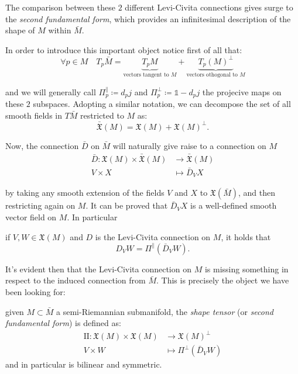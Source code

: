 The comparison between these \(2\) different Levi-Civita connections gives surge to the \emph{second fundamental form}, which provides an infinitesimal description of the shape of \(M\) within \(\bar{M}\).

In order to introduce this important object notice first of all that:
\[
\forall p \in M \quad T_p\bar{M} = \underbrace{T_pM}_{\text{vectors tangent to }M}+ \underbrace{T_p(M)^{\perp}}_{\text{vectors othogonal to } M}
\]

\noindent and we will generally call \(\Pi_p^{\parallel}\coloneqq d_pj\) and \(\Pi_p^{\perp}\coloneqq \mathbb{1} - d_pj\) the projecive maps on these \(2\) subspaces.
Adopting a similar notation, we can decompose the set of all smooth fields in \(T\bar{M}\) restricted to \(M\) as:
\[
\bar{\mathfrak{X}}(M) = \mathfrak{X}(M) + \mathfrak{X}(M)^{\perp}.
\]

Now, the connection \(\bar{D}\) on \(\bar{M}\) will naturally give raise to a connection on \(M\)
\begin{align*}
\bar{D} : \mathfrak{X}(M) \times \bar{\mathfrak{X}}(M) & \rightarrow \bar{\mathfrak{X}}(M) \\
	 V \times X &\mapsto \bar{D}_V X
\end{align*}

by taking any smooth extension of the fields \(V\) and \(X\) to \(\mathfrak{X}(\bar{M})\), and then restricting again on \(M\). It can be proved that \(\bar{D}_V X\) is a well-defined smooth vector field on \(M\). In particular
\begin{lemma} 
	if \(V, W \in \mathfrak{X}(M)\) and \(D\) is the Levi-Civita connection on \(M\), it holds that
	\[
	D_V W = \Pi^{\parallel}\left(\bar{D}_V W\right).
	\]
\end{lemma}

It's evident then that the Levi-Civita connection on \(M\) is  missing something in respect to the induced connection from \(\bar{M}\). This is precisely the object we have been looking for:

\begin{definition}
	given \(M \subset \bar{M}\) a semi-Riemannian submanifold, the \emph{shape tensor} (or \emph{second fundamental form}) is defined as:
	\begin{align*}
		\mathrm{I\!I} : \mathfrak{X}(M) \times \mathfrak{X}(M) &\longrightarrow \mathfrak{X}(M)^{\perp}\\
							V \times W &\mapsto \Pi^{\perp}\left(\bar{D}_V W\right)
	\end{align*}
	\noindent and in particular is bilinear and symmetric.
\end{definition}

